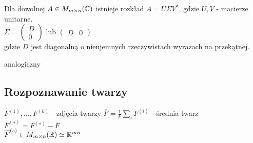 \begin{tw}
    Dla dowolnej $A \in M_{m \times n}(\mathbb{C})$ istnieje rozkład $A = U\Sigma V^*$, gdzie $U, V$ - macierze 
    unitarne. \\
    $\Sigma = \begin{pmatrix} D \\ 0 \end{pmatrix}$ lub $\begin{pmatrix} D & 0 \end{pmatrix}$ \\ 
    gdzie $D$ jest diagonalną o nieujemnych rzeczywistach wyrazach na przekątnej. 
\end{tw} 
\begin{dd} analogiczny \end{dd} 
\subsection{Rozpoznawanie twarzy} 
$F^{(1)},\ldots,F^{(k)}$ - zdjęcia twarzy 
$\overline F = \frac{1}{k} \sum\limits_i F^{(i)}$ - średnia twarz \\ 
$\overline F^{(s)} = F^{(s)} - \overline F$ \\ 
$\overline F^{(s)} \in M_{m \times n}(\mathbb{R}) \simeq \mathbb{R}^{mn}$ \\ 
